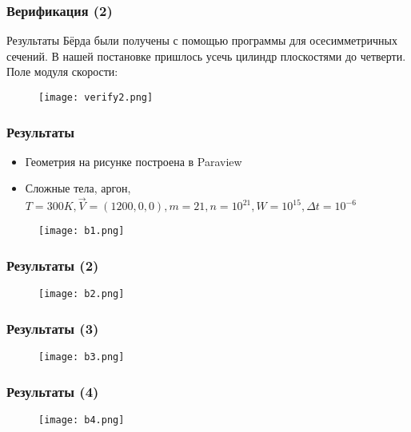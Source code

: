 \documentclass[onlymath]{beamer}
\begin{document}
\begin{frame}
  \frametitle{Верификация (2)}
  Результаты Бёрда были получены с помощью программы для
  осесимметричных сечений. В нашей постановке пришлось усечь цилиндр
  плоскостями до четверти. Поле модуля скорости:
  \begin{figure}
    \centering
    \texttt{[image: verify2.png]}
  \end{figure}
\end{frame}

\begin{frame}
  \frametitle{Результаты}
  \begin{itemize}
  \item Геометрия на рисунке построена в Paraview
  \item Сложные тела, аргон, $T = 300K, \vec{V} = (1200, 0, 0), m =
    21, n = 10^{21}, W = 10^{15}, \Delta t = 10^{-6}$
  \end{itemize}
  \begin{figure}
    \centering
    \texttt{[image: b1.png]}
  \end{figure}
\end{frame}

\begin{frame}
  \frametitle{Результаты (2)}
  \begin{figure}
    \centering
    \texttt{[image: b2.png]}
  \end{figure}
\end{frame}

\begin{frame}
  \frametitle{Результаты (3)}
  \begin{figure}
    \centering
    \texttt{[image: b3.png]}
  \end{figure}
\end{frame}

\begin{frame}
  \frametitle{Результаты (4)}
  \begin{figure}
    \centering
    \texttt{[image: b4.png]}
  \end{figure}
\end{frame}
\end{document}
